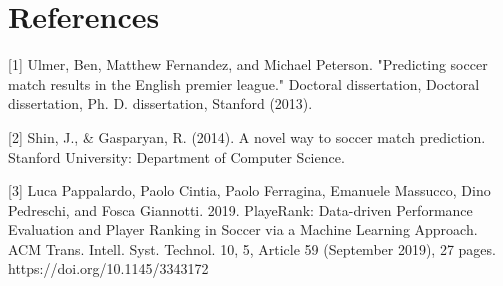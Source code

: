 \documentclass{article}
\begin{document}
\section{References}

\small{


[1] Ulmer, Ben, Matthew Fernandez, and Michael Peterson. "Predicting soccer match results in the English premier league." Doctoral dissertation, Doctoral dissertation, Ph. D. dissertation, Stanford (2013).


[2] Shin, J., \& Gasparyan, R. (2014). A novel way to soccer match prediction. Stanford University: Department of Computer Science.


[3] Luca Pappalardo, Paolo Cintia, Paolo Ferragina, Emanuele Massucco, Dino Pedreschi, and Fosca Giannotti. 2019. PlayeRank: Data-driven Performance Evaluation and Player Ranking in Soccer via a Machine Learning Approach. ACM Trans. Intell. Syst. Technol. 10, 5, Article 59 (September 2019), 27 pages. https://doi.org/10.1145/3343172
}
\normalsize

\end{document}

